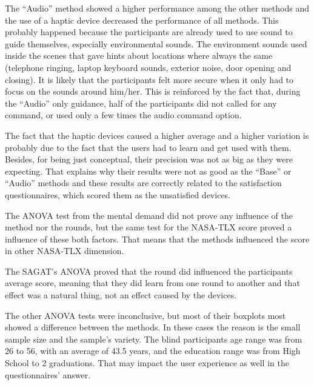 


The “Audio” method showed a higher performance among the other methods and the use of a haptic device decreased the performance of all methods. This probably happened because the participants are already used to use sound to guide themselves, especially environmental sounds. The environment sounds used inside the scenes that gave hints about locations where always the same (telephone ringing, laptop keyboard sounds, exterior noise, door opening and closing). It is likely that the participants felt more secure when it only had to focus on the sounds around him/her. This is reinforced by the fact that, during the “Audio” only guidance, half of the participants did not called for any command, or used only a few times the audio command option.

The fact that the haptic devices caused a higher average and a higher variation is probably due to the fact that the users had to learn and get used with them. Besides, for being just conceptual, their precision was not as big as they were expecting. That explains why their results were not as good as the “Base” or “Audio” methods and these results are correctly related to the satisfaction questionnaires, which scored them as the unsatisfied devices.

The ANOVA test from the mental demand did not prove any influence of the method nor the rounds, but the same test for the NASA-TLX score proved a influence of these both factors. That means that the methods influenced the score in other NASA-TLX dimension.

The SAGAT's ANOVA proved that the round did influenced the participants average score, meaning that they did learn from one round to another and that effect was a natural thing, not an effect caused by the devices.

The other ANOVA tests were inconclusive, but most of their boxplots most showed a difference between the methods. In these cases the reason is the small sample size and the sample’s variety. The blind participants age range was from 26 to 56, with an average of 43.5 years, and the education range was from High School to 2 graduations. That may impact the user experience as well in the questionnaires' answer.

